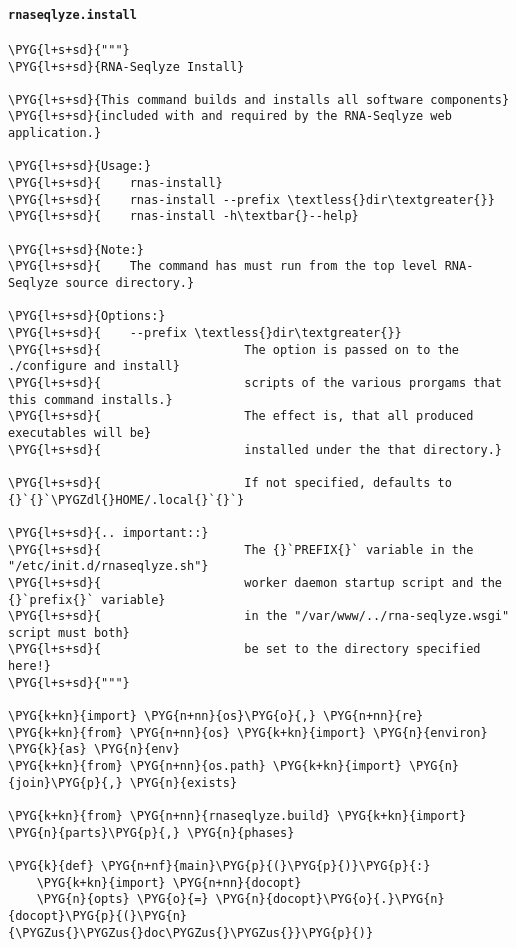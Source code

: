 \paragraph{\texttt{rnaseqlyze.install}}
\label{index-pdf4:rnaseqlyze-install}
\begin{Verbatim}[commandchars=\\\{\}]
\PYG{l+s+sd}{"""}
\PYG{l+s+sd}{RNA-Seqlyze Install}

\PYG{l+s+sd}{This command builds and installs all software components}
\PYG{l+s+sd}{included with and required by the RNA-Seqlyze web application.}

\PYG{l+s+sd}{Usage:}
\PYG{l+s+sd}{    rnas-install}
\PYG{l+s+sd}{    rnas-install --prefix \textless{}dir\textgreater{}}
\PYG{l+s+sd}{    rnas-install -h\textbar{}--help}

\PYG{l+s+sd}{Note:}
\PYG{l+s+sd}{    The command has must run from the top level RNA-Seqlyze source directory.}

\PYG{l+s+sd}{Options:}
\PYG{l+s+sd}{    --prefix \textless{}dir\textgreater{}}
\PYG{l+s+sd}{                    The option is passed on to the ./configure and install}
\PYG{l+s+sd}{                    scripts of the various prorgams that this command installs.}
\PYG{l+s+sd}{                    The effect is, that all produced executables will be}
\PYG{l+s+sd}{                    installed under the that directory.}

\PYG{l+s+sd}{                    If not specified, defaults to {}`{}`\PYGZdl{}HOME/.local{}`{}`}

\PYG{l+s+sd}{.. important::}
\PYG{l+s+sd}{                    The {}`PREFIX{}` variable in the "/etc/init.d/rnaseqlyze.sh"}
\PYG{l+s+sd}{                    worker daemon startup script and the {}`prefix{}` variable}
\PYG{l+s+sd}{                    in the "/var/www/../rna-seqlyze.wsgi" script must both}
\PYG{l+s+sd}{                    be set to the directory specified here!}
\PYG{l+s+sd}{"""}

\PYG{k+kn}{import} \PYG{n+nn}{os}\PYG{o}{,} \PYG{n+nn}{re}
\PYG{k+kn}{from} \PYG{n+nn}{os} \PYG{k+kn}{import} \PYG{n}{environ} \PYG{k}{as} \PYG{n}{env}
\PYG{k+kn}{from} \PYG{n+nn}{os.path} \PYG{k+kn}{import} \PYG{n}{join}\PYG{p}{,} \PYG{n}{exists}

\PYG{k+kn}{from} \PYG{n+nn}{rnaseqlyze.build} \PYG{k+kn}{import} \PYG{n}{parts}\PYG{p}{,} \PYG{n}{phases}

\PYG{k}{def} \PYG{n+nf}{main}\PYG{p}{(}\PYG{p}{)}\PYG{p}{:}
    \PYG{k+kn}{import} \PYG{n+nn}{docopt}
    \PYG{n}{opts} \PYG{o}{=} \PYG{n}{docopt}\PYG{o}{.}\PYG{n}{docopt}\PYG{p}{(}\PYG{n}{\PYGZus{}\PYGZus{}doc\PYGZus{}\PYGZus{}}\PYG{p}{)}


\end{Verbatim}
